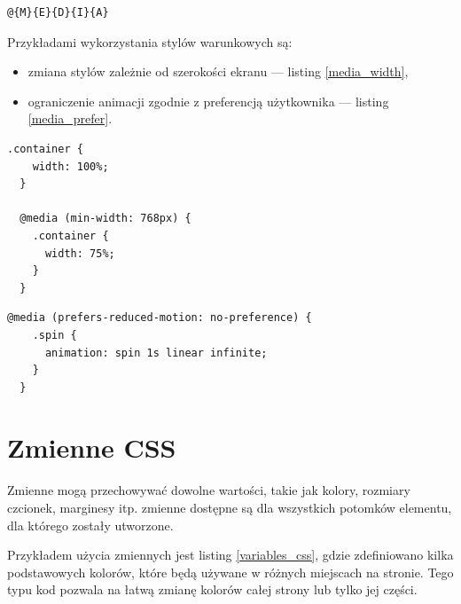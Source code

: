 \documentclass[a4paper,12pt]{book} %
\begin{document}
\begin{lstfloat}[hb]
  \lstset{language=HTML}
  \begin{lstlisting}[frame=single]
  @{M}{E}{D}{I}{A}
\end{lstlisting}
  \caption{Składnia tokena \lstinline|MEDIA_SYM| zwracanego przez lekser CSS \cite{GrammarofCSS}}\label{media_list}
\end{lstfloat}

\clearpage

Przykładami wykorzystania stylów warunkowych są:
\begin{itemize}
  \item zmiana stylów zależnie od szerokości ekranu --- listing \ref{media_width},
  \item ograniczenie animacji zgodnie z preferencją użytkownika --- listing \ref{media_prefer}.
\end{itemize}

\begin{lstfloat}[hb]
  \lstset{language=HTML}
  \begin{lstlisting}[frame=single]
  .container {
    width: 100%;
  }

  @media (min-width: 768px) {
    .container {
      width: 75%;
    }
  }
\end{lstlisting}
  \caption{Reguły zmieniająca szerokość elementu zależnie od szerokości ekranu}\label{media_width}
\end{lstfloat}

\begin{lstfloat}[hb]
  \lstset{language=HTML}
  \begin{lstlisting}[frame=single]
  @media (prefers-reduced-motion: no-preference) {
    .spin {
      animation: spin 1s linear infinite;
    }
  }
\end{lstlisting}
  \caption{Reguła ograniczająca animacje zgodnie z preferencją użytkownika}\label{media_prefer}
\end{lstfloat}



\section{Zmienne CSS}
Zmienne mogą przechowywać dowolne wartości, takie jak kolory, rozmiary czcionek, marginesy itp. zmienne dostępne są dla wszystkich potomków elementu, dla którego zostały utworzone.

Przykładem użycia zmiennych jest listing \ref{variables_css}, gdzie zdefiniowano kilka podstawowych kolorów, które będą używane w różnych miejscach na stronie. Tego typu kod pozwala na łatwą zmianę kolorów całej strony lub tylko jej części.
\end{document}
